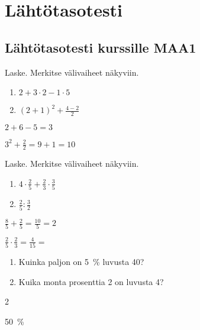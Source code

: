 \chapter{Lähtötasotesti}


\section*{Lähtötasotesti kurssille MAA1}

\begin{tehtava}
Laske. Merkitse välivaiheet näkyviin. 
\begin{enumerate}
\item $2+3\cdot 2-1\cdot5$
\item $(2+1)^2+\frac{4-2}{2}$
\end{enumerate}
\begin{vastaus}
\item $2+6-5=3$
\item $3^2+\frac{2}{2}=9+1=10$
\end{vastaus}
\end{tehtava}

\begin{tehtava}
Laske. Merkitse välivaiheet näkyviin. 
\begin{enumerate}
\item $4\cdot \frac{2}{5} + \frac{2}{3}\cdot \frac{3}{5}$
\item $\frac{2}{5} : \frac{3}{2}$
\end{enumerate}
\begin{vastaus}
\item $\frac{8}{5} + \frac{2}{5}=\frac{10}{5} = 2$
\item $\frac{2}{5} \cdot \frac{2}{3}=\frac{4}{15}=$
\end{vastaus}
\end{tehtava}

\begin{tehtava}
\begin{enumerate}
\item Kuinka paljon on 5~\% luvusta 40?
\item Kuika monta prosenttia 2 on luvusta 4?
\end{enumerate}
\begin{vastaus}
\item 2
\item 50~\%
\end{vastaus}
\end{tehtava}

